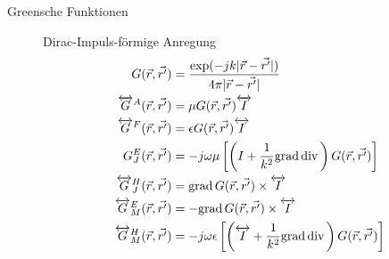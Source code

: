 \begin{description}
\item[Greensche Funktionen] Dirac-Impuls-förmige Anregung
\begin{align*}
G(\vec{r},\vec{r'}) &= \frac{\exp(-jk|\vec{r}-\vec{r'}|)}{4\pi|\vec{r}-\vec{r'}|} \\
\overleftrightarrow{G}^A(\vec{r},\vec{r'}) &= \mu G(\vec{r},\vec{r'}) \overleftrightarrow{I}\\
\overleftrightarrow{G}^F(\vec{r},\vec{r'}) &= \epsilon G(\vec{r},\vec{r'}) \overleftrightarrow{I}\\
G^E_J(\vec{r},\vec{r'}) &= -j\omega\mu\left[\left( I + \frac{1}{k^2}\grad\div \right) G(\vec{r},\vec{r'}) \right]\\
\overleftrightarrow{G}^H_J(\vec{r},\vec{r'}) &= \grad G(\vec{r},\vec{r'}) \times \overleftrightarrow{I}\\
\overleftrightarrow{G}^E_M(\vec{r},\vec{r'}) &= -\grad G(\vec{r},\vec{r'}) \times \overleftrightarrow{I}\\
\overleftrightarrow{G}^H_M(\vec{r},\vec{r'}) &= -j\omega\epsilon\left[\left( \overleftrightarrow{I} + \frac{1}{k^2}\grad\div \right) G(\vec{r},\vec{r'}) \right]\\

\end{align*}
\end{description}
